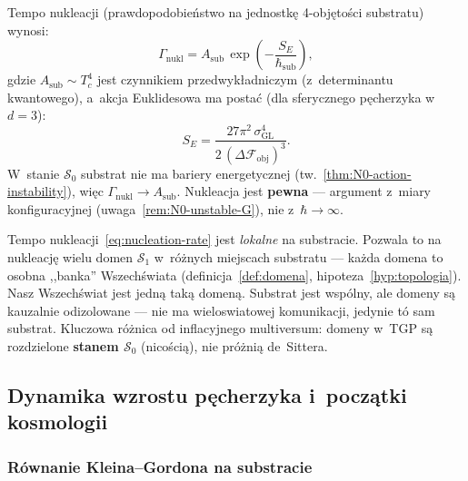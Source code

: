 \begin{proposition}\label{prop:nucleation-rate}
Tempo nukleacji (prawdopodobie\'nstwo na jednostk\k{e}
4-obj\k{e}to\'sci substratu) wynosi:
\begin{equation}\label{eq:nucleation-rate}
    \Gamma_\mathrm{nukl}
    = A_\mathrm{sub}\,\exp\!\left(-\frac{S_E}{\hbar_{\mathrm{sub}}}\right),
\end{equation}
gdzie $A_\mathrm{sub} \sim T_c^4$ jest czynnikiem
przedwyk\l{}adniczym (z~determinantu kwantowego),
a~akcja Euklidesowa ma posta\'c (dla sferycznego p\k{e}cherzyka
w~$d = 3$):
\begin{equation}\label{eq:SE-bubble}
    S_E = \frac{27\pi^2\,\sigma_\mathrm{GL}^4}{2\,(\Delta\mathcal{F}_\mathrm{obj})^3}.
\end{equation}
W~stanie $\mathcal{S}_0$ substrat nie ma bariery energetycznej
(tw.~\ref{thm:N0-action-instability}), wi\k{e}c
$\Gamma_\mathrm{nukl} \to A_\mathrm{sub}$.
Nukleacja jest \textbf{pewna} --- argument z~miary
konfiguracyjnej (uwaga~\ref{rem:N0-unstable-G}),
nie z~$\hbar \to \infty$.
\end{proposition}

\begin{remark}
Tempo nukleacji~\eqref{eq:nucleation-rate} jest
\emph{lokalne} na substracie. Pozwala to na nukleacj\k{e}
wielu domen $\mathcal{S}_1$ w~r\'o\.znych miejscach
substratu --- ka\.zda domena to osobna ,,banka'' Wszech\'swiata
(definicja~\ref{def:domena}, hipoteza~\ref{hyp:topologia}).
Nasz Wszech\'swiat jest jedn\k{a} tak\k{a} domen\k{a}. Substrat
jest wsp\'olny, ale domeny s\k{a} kauzalnie odizolowane ---
nie ma wieloswiatowej komunikacji, jedynie t\'o sam substrat.
Kluczowa r\'o\.znica od inflacyjnego multiversum:
domeny w~TGP s\k{a} rozdzielone \textbf{stanem $\mathcal{S}_0$}
(nico\'sci\k{a}), nie pr\'o\.zni\k{a} de~Sittera.
\end{remark}

\subsection{Dynamika wzrostu p\k{e}cherzyka i~pocz\k{a}tki kosmologii}%
\label{app:G-dynamika}

\subsubsection{R\'ownanie Kleina--Gordona na substracie}

